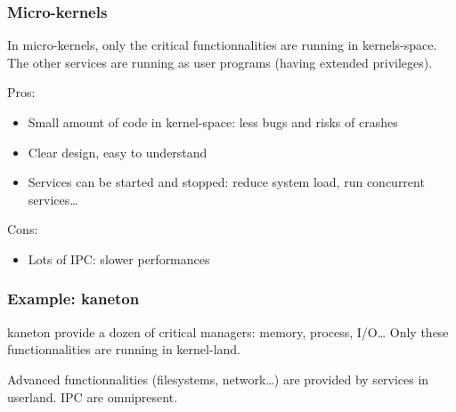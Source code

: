 \begin{frame}
  \frametitle{Micro-kernels}

  In micro-kernels, only the critical functionnalities are running in
  kernels-space. The other services are running as user programs
  (having extended privileges).

  \-

  Pros:

  \begin{itemize}
  \item
    Small amount of code in kernel-space: less bugs and risks of
    crashes
  \item
    Clear design, easy to understand
  \item
    Services can be started and stopped: reduce system load, run
    concurrent services\ldots
  \end{itemize}

  \-

  Cons:

  \begin{itemize}
  \item
    Lots of IPC: slower performances
  \end{itemize}

\end{frame}

%
%

\begin{frame}
  \frametitle{Example: kaneton}

  kaneton provide a dozen of critical managers: memory, process,
  I/O\ldots{} Only these functionnalities are running in kernel-land.

  \begin{center}
  \end{center}

  Advanced functionnalities (filesystems, network\ldots) are provided
  by services in userland. IPC are omnipresent.

\end{frame}

